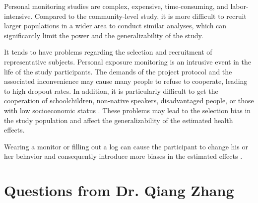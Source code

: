 \documentclass[11pt]{article}
\begin{document}
\begin{itemize*}
{\begin{enumerate*}[{[(1)]}]
            \item Personal monitoring studies are complex, expensive, time-consuming, and labor-intensive. Compared to the community-level study, it is more difficult to recruit larger populations in a wider area to conduct similar analyses, which can significantly limit the power and the generalizability of the study. 
            \item It tends to have problems regarding the selection and recruitment of representative subjects. Personal exposure monitoring is an intrusive event in the life of the study participants. The demands of the project protocol and the associated inconvenience may cause many people to refuse to cooperate, leading to high dropout rates. In addition, it is particularly difficult to get the cooperation of schoolchildren, non-native speakers, disadvantaged people, or those with low socioeconomic status \citep{watson1988air}. These problems may lead to the selection bias in the study population and affect the generalizability of the estimated health effects. 
            \item Wearing a monitor or filling out a log can cause the participant to change his or her behavior and consequently introduce more biases in the estimated effects \citep{ryan1986estimating}.
        \end{enumerate*}
    }
\end{itemize*}



\hdashrule{\textwidth}{0.1pt}{3mm 3pt 1mm 3pt}
\setcounter{section}{0}

\section*{Questions from Dr. Qiang Zhang}
\end{document}

